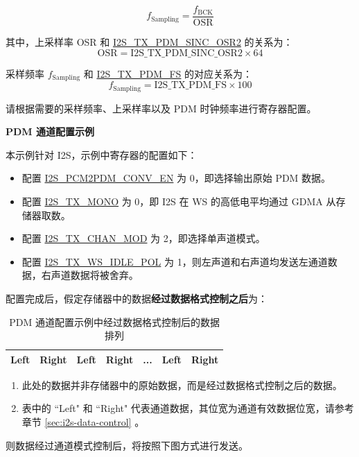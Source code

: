 \documentclass[main\_\_CN.tex]{subfiles}
\begin{document}
\begin{itemize}
    $$f_{\mathrm{Sampling}} = \frac{f_{\mathrm{BCK}}}{\mathrm{OSR}}$$
    
    其中，上采样率 OSR 和 \hyperref[fielddesc:I2STXPDMSINCOSR2]{I2S\_TX\_PDM\_SINC\_OSR2} 的关系为：
    $$\mathrm{OSR} = \mathrm{\hyperref[fielddesc:I2STXPDMSINCOSR2]{I2S\_TX\_PDM\_SINC\_OSR2}} \times 64$$
    
    采样频率 $f_{\mathrm{Sampling}}$ 和 \hyperref[fielddesc:I2STXPDMFS]{I2S\_TX\_PDM\_FS} 的对应关系为：
    $$f_{\mathrm{Sampling}} = \mathrm{\hyperref[fielddesc:I2STXPDMFS]{I2S\_TX\_PDM\_FS}} \times 100$$
    
    请根据需要的采样频率、上采样率以及 PDM 时钟频率进行寄存器配置。
\end{itemize}


\textbf{PDM 通道配置示例}

本示例针对 I2S，示例中寄存器的配置如下：

\begin{itemize}
    \item 配置 \hyperref[fielddesc:I2SPCM2PDMCONVEN]{I2S\_PCM2PDM\_CONV\_EN} 为 0，即选择输出原始 PDM 数据。
    \item 配置 \hyperref[fielddesc:I2STXMONO]{I2S\_TX\_MONO} 为 0，即 I2S 在 WS 的高低电平均通过 GDMA 从存储器取数。
    \item 配置 \hyperref[fielddesc:I2STXCHANMOD]{I2S\_TX\_CHAN\_MOD} 为 2，即选择单声道模式。
    \item 配置 \hyperref[fielddesc:I2STXWSIDLEPOL]{I2S\_TX\_WS\_IDLE\_POL} 为 1，则左声道和右声道均发送左通道数据，右声道数据将被舍弃。
\end{itemize}

配置完成后，假定存储器中的数据\textbf{经过数据格式控制之后}为：

\begin{table}[H]
    \centering
    \caption{PDM 通道配置示例中经过数据格式控制后的数据排列}
    \label{tab:i2s-pdm-chan-example-data}
    \begin{tabular}{|c|c|c|c|c|c|c|}
    \hline
    Left & Right & Left & Right & ... & Left & Right \\ \hline
    \end{tabular}
\end{table}
\vspace{-0.5em}
\begin{tiplisting}
\vspace{-2em}
\begin{enumerate}
    \item 此处的数据并非存储器中的原始数据，而是经过数据格式控制之后的数据。
    \item 表中的 ``Left" 和 ``Right" 代表通道数据，其位宽为通道有效数据位宽，请参考章节 \ref{sec:i2s-data-control} \textit{}。
\end{enumerate}
\end{tiplisting}
\vspace{-1em}
则数据经过通道模式控制后，将按照下图方式进行发送。
\end{document}
